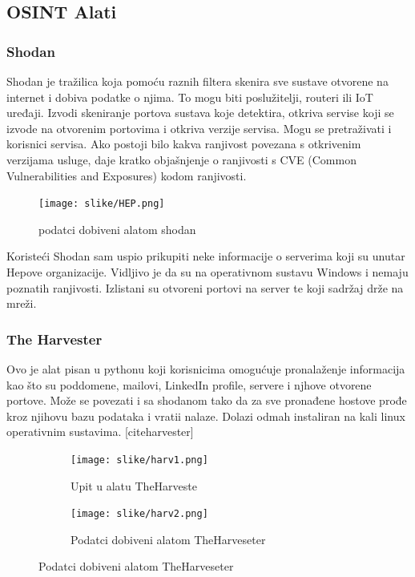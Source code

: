 \documentclass[times, utf8, zavrsni]{fer}
\begin{document}
\subsection{OSINT Alati}
\subsubsection{Shodan}
Shodan je tražilica koja pomoću raznih filtera skenira sve sustave otvorene na internet i dobiva podatke o njima. To mogu biti poslužitelji, routeri ili IoT uređaji. Izvodi skeniranje portova sustava koje detektira, otkriva servise koji se izvode na otvorenim portovima i otkriva verzije servisa. Mogu se pretraživati i korisnici servisa. Ako postoji bilo kakva ranjivost povezana s otkrivenim verzijama usluge, daje kratko objašnjenje o ranjivosti s CVE (Common Vulnerabilities and Exposures) kodom ranjivosti.

\begin{figure}[htb]
\centering
\texttt{[image: slike/HEP.png]}
\caption{podatci dobiveni alatom shodan}
\label{fig:shodan}
\end{figure}

Koristeći Shodan sam uspio prikupiti neke informacije o serverima koji su unutar Hepove organizacije. Vidljivo je da su na operativnom sustavu Windows i nemaju  poznatih ranjivosti. Izlistani su otvoreni portovi na server te koji sadržaj drže na mreži.
\subsubsection{The Harvester}
Ovo je alat pisan u pythonu koji korisnicima omogućuje pronalaženje informacija kao što su poddomene, mailovi, LinkedIn profile, servere i njhove otvorene portove. Može se povezati i sa shodanom tako da za sve pronađene hostove prođe kroz njihovu bazu podataka i vratii nalaze.
Dolazi odmah instaliran na kali linux operativnim sustavima. [cite{harvester}]

\begin{figure}[htbp]
\centering
\begin{subfigure}[b]{0.5\textwidth}
    \texttt{[image: slike/harv1.png]}
    \caption{Upit u alatu TheHarveste}
    \label{fig:harvester1}
  \end{subfigure}
\begin{subfigure}[b]{0.5\textwidth}
    \texttt{[image: slike/harv2.png]}
    \caption{Podatci dobiveni alatom TheHarveseter}
    \label{fig:harvester2}
  \end{subfigure}
\end{figure}
\end{document}
